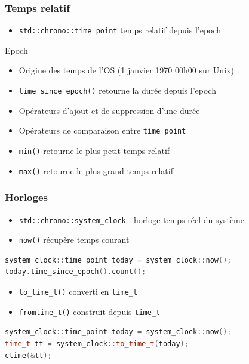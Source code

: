 \documentclass[C++.tex]{subfiles}
\begin{document}
\begin{frame}[fragile]
	\frametitle{Temps relatif}
	\begin{itemize}
		\item \lstinline|std::chrono::time_point| temps relatif depuis l'epoch
	\end{itemize}

	\begin{block}{Epoch}
		\begin{itemize}
			\item Origine des temps de l'OS (1 janvier 1970 00h00 sur Unix)
		\end{itemize}
	\end{block}

	\begin{itemize}
		\item \lstinline|time_since_epoch()| retourne la durée depuis l'epoch
		\item Opérateurs d'ajout et de suppression d'une durée
		\item Opérateurs de comparaison entre \lstinline|time_point|
		\item \lstinline|min()| retourne le plus petit temps relatif
		\item \lstinline|max()| retourne le plus grand temps relatif
	\end{itemize}
\end{frame}

\begin{frame}[fragile]
	\frametitle{Horloges}
	\begin{itemize}
		\item \lstinline|std::chrono::system_clock| : horloge temps-réel du système
		\item \lstinline|now()| récupère temps courant
	\end{itemize}

	\begin{lstlisting}[language=C++]
system_clock::time_point today = system_clock::now();
today.time_since_epoch().count();\end{lstlisting}

	\begin{itemize}
		\item \lstinline|to_time_t()| converti en \lstinline|time_t|
		\item \lstinline|fromtime_t()| construit depuis \lstinline|time_t|
	\end{itemize}

	\begin{lstlisting}[language=C++]
system_clock::time_point today = system_clock::now();
time_t tt = system_clock::to_time_t(today);
ctime(&tt);\end{lstlisting}
\end{frame}
\end{document}
